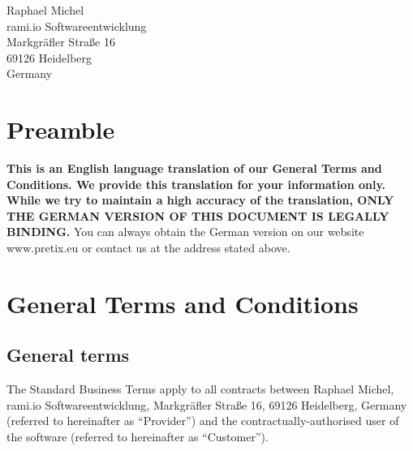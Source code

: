\documentclass{terms}
\begin{document}
\maketitle

\begin{center}
Raphael Michel\\
rami.io Softwareentwicklung\\
Markgräfler Straße 16\\
69126 Heidelberg\\
Germany
\end{center}
\sloppy

\section*{Preamble}

\textbf{This is an English language translation of our General Terms and Conditions. We provide this translation for your information only. While we try to maintain a high accuracy of the translation, ONLY THE GERMAN VERSION OF THIS DOCUMENT IS LEGALLY BINDING.}
You can always obtain the German version on our website www.pretix.eu or contact us at the address stated above.

\section{General Terms and Conditions}
\subsection{General terms}
The Standard Business Terms apply to all contracts between Raphael Michel, rami.io Softwareentwicklung, Markgräfler Straße 16, 69126 Heidelberg, Germany (referred to hereinafter as “Provider”) and the contractually-authorised user of the software (referred to hereinafter as “Customer”).
\end{document}
